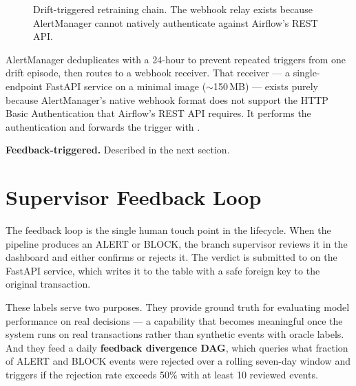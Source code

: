 \begin{figure}[htbp]
\centering
{}
\caption{Drift-triggered retraining chain. The webhook relay exists because AlertManager cannot natively authenticate against Airflow's REST API.}
\label{fig:drift}
\end{figure}

AlertManager deduplicates with a 24-hour  to prevent repeated triggers from one drift episode, then routes to a webhook receiver. That receiver --- a single-endpoint FastAPI service on a minimal  image ($\sim$150\,MB) --- exists purely because AlertManager's native webhook format does not support the HTTP Basic Authentication that Airflow's REST API requires. It performs the authentication and forwards the trigger with .

\textbf{Feedback-triggered.} Described in the next section.

\section{Supervisor Feedback Loop}

The feedback loop is the single human touch point in the lifecycle. When the pipeline produces an ALERT or BLOCK, the branch supervisor reviews it in the dashboard and either confirms or rejects it. The verdict is submitted to  on the FastAPI service, which writes it to the  table with a safe foreign key to the original transaction.

These labels serve two purposes. They provide ground truth for evaluating model performance on real decisions --- a capability that becomes meaningful once the system runs on real transactions rather than synthetic events with oracle labels. And they feed a daily \textbf{feedback divergence DAG}, which queries what fraction of ALERT and BLOCK events were rejected over a rolling seven-day window and triggers  if the rejection rate exceeds 50\% with at least 10 reviewed events.

